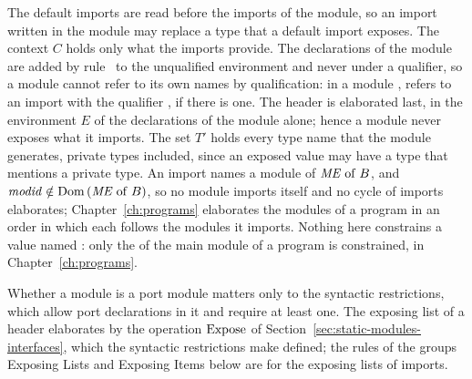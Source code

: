 

\begin{rulecomments}
 The default imports are read before the imports of the
module, so an import written in the module may replace a type that a default
import exposes. %
The context $C$ holds only what the imports provide. The declarations of the
module are added by rule~ to the unqualified
environment and never under a qualifier, so a module cannot refer to its own
names by qualification: in a module ,  refers to an import with
the qualifier , if there is one. %
The header is elaborated last, in the environment $E$ of the declarations of
the module alone; hence a module never exposes what it imports. The set $T'$
holds every type name that the module generates, private types included,
since an exposed value may have a type that mentions a private type. %
An import names a module of $\mathit{ME} \mathrel{\mathrm{of}} B$, and $\mathit{modid} \notin \mathrm{Dom}\,(\mathit{ME} \mathrel{\mathrm{of}} B)$,
so no module imports itself and no cycle of imports elaborates;
Chapter~\ref{ch:programs} elaborates the modules of a program in an order in
which each follows the modules it imports. Nothing here constrains a value
named : only the  of the main module of a program is
constrained, in Chapter~\ref{ch:programs}. %
\end{rulecomments}



\begin{rulecomments}
 Whether a module is a port module matters only to the
syntactic restrictions, which allow port declarations in it and require at
least one. The exposing list of a header elaborates by the operation $\mathrm{Expose}$
of Section~\ref{sec:static-modules-interfaces}, which the syntactic
restrictions make defined; the rules of the groups Exposing Lists and Exposing
Items below are for the exposing lists of imports.
\end{rulecomments}

